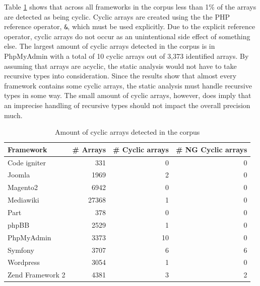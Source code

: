 Table \ref{tab:cyclic_arrays} shows that across all frameworks in the corpus less than 1\% of the arrays are detected as being cyclic. Cyclic arrays are created using the the PHP reference operator, \texttt{\&}, which must be used explicitly. Due to the explicit reference operator, cyclic arrays do not occur as an unintentional side effect of something else. The largest amount of cyclic arrays detected in the corpus is in PhpMyAdmin with a total of 10 cyclic arrays out of 3,373 identified arrays. By assuming that arrays are acyclic, the static analysis would not have to take recursive types into consideration. Since the results show that almost every framework contains some cyclic arrays, the static analysis must handle recursive types in some way. The small amount of cyclic arrays, however, does imply that an imprecise handling of recursive types should not impact the overall precision much.

\begin{table}[htbp]
\begin{center}
\begin{tabular}{l| r  r  r}
Framework & \# Arrays & \# Cyclic arrays & \# NG Cyclic arrays  \\ \hline \hline
Code igniter & 331 & 0 & 0 \\
Joomla & 1969 & 2 & 0\\ 
Magento2 & 6942 & 0 & 0\\ 
Mediawiki & 27368 & 1 & 0\\ 
Part & 378 & 0 & 0\\ 
phpBB & 2529 & 1 & 0\\
PhpMyAdmin & 3373 & 10 & 0\\
Symfony & 3707 & 6 & 6\\ %
Wordpress & 3054 & 1 & 0\\ 
Zend Framework 2 & 4381 & 3 & 2
\end{tabular}
\end{center}
\caption{Amount of cyclic arrays detected in the corpus}
\label{tab:cyclic_arrays}
\end{table}

